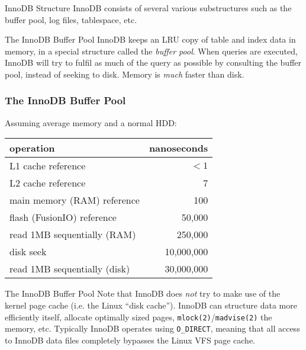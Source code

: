 \documentclass[14pt]{beamer}
\begin{document}
\begin{frame}{InnoDB Structure}
  InnoDB consists of several various substructures such as the buffer pool, log
  files, tablespace, etc.
\end{frame}

\begin{frame}{The InnoDB Buffer Pool}
  InnoDB keeps an LRU copy of table and index data in memory, in a special
  structure called the \emph{buffer pool}. When queries are executed, InnoDB
  will try to fulfil as much of the query as possible by consulting the buffer
  pool, instead of seeking to disk.
  \newline
  \newline
  Memory is \emph{much} faster than disk.
\end{frame}

\begin{frame}[fragile]
  \frametitle{The InnoDB Buffer Pool}
  Assuming average memory and a normal HDD:
  \begin{table}[ht]
    \begin{tabular}{l r}
      operation                    & nanoseconds \\ \hline
      L1 cache reference           & $<1$        \\
      L2 cache reference           & 7           \\
      main memory (RAM) reference  & 100         \\
      flash (FusionIO) reference   & 50,000      \\
      read 1MB sequentially (RAM)  & 250,000     \\
      disk seek                    & 10,000,000  \\
      read 1MB sequentially (disk) & 30,000,000  \\
    \end{tabular}
  \end{table}
\end{frame}

\begin{frame}{The InnoDB Buffer Pool}
  Note that InnoDB does \emph{not} try to make use of the kernel page cache
  (i.e. the Linux ``disk cache''). InnoDB can structure data more efficiently
  itself, allocate optimally sized pages, \texttt{mlock(2)}/\texttt{madvise(2)}
  the memory, etc.
  \newline
  \newline
  Typically InnoDB operates using \texttt{O\_DIRECT}, meaning that all access to
  InnoDB data files completely bypasses the Linux VFS page cache.
\end{frame}
\end{document}
